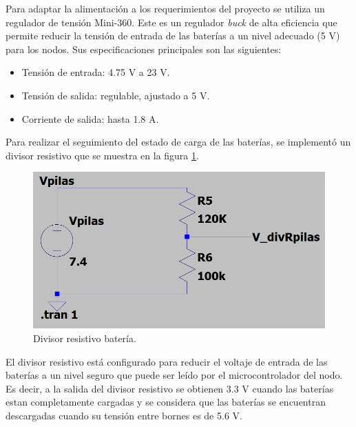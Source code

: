 Para adaptar la alimentación a los requerimientos del proyecto se utiliza un regulador de tensión Mini-360\cite{MINI360}. Este es un regulador \textit{buck} de alta eficiencia que permite reducir la tensión de entrada de las baterías a un nivel adecuado (5 V) para los nodos. Sus especificaciones principales son las siguientes:

\begin{itemize}
    \item Tensión de entrada: 4.75 V a 23 V.
    \item Tensión de salida: regulable, ajustado a 5 V.
    \item Corriente de salida: hasta 1.8 A.
\end{itemize}

Para realizar el seguimiento del estado de carga de las baterías, se implementó un divisor resistivo que se muestra en la figura \ref{fig:DivresistivoBat}.

\begin{figure}[H]
	\centering
	\includegraphics[scale=0.6]{./Figures/Hardware/Alimentacion/divisor_pilas.png}
	\caption{Divisor resistivo batería.}
	\label{fig:DivresistivoBat}
\end{figure}

El divisor resistivo está configurado para reducir el voltaje de entrada de las baterías a un nivel seguro que puede ser leído por el microcontrolador del nodo. 
Es decir, a la salida del divisor resistivo se obtienen 3.3 V cuando las baterías estan completamente cargadas y se considera que las baterías se encuentran descargadas cuando su tensión entre bornes es de 5.6 V.


